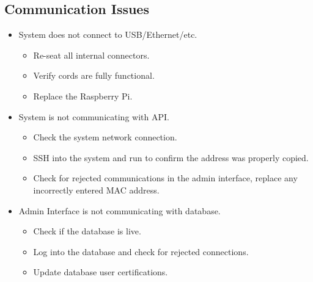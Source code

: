 \subsection{Communication Issues}
\begin{itemize}
    \item System does not connect to USB/Ethernet/etc.
    \begin{itemize}
        \item Re-seat all internal connectors.
        \item Verify cords are fully functional.
        \item Replace the Raspberry Pi.
    \end{itemize}
    \item System is not communicating with API.
    \begin{itemize}
        \item Check the system network connection.
        \item SSH into the system and run  to confirm the address was properly copied.
        \item Check for rejected communications in the admin interface, replace any incorrectly entered MAC address.
    \end{itemize}
    \item Admin Interface is not communicating with database.
    \begin{itemize}
        \item Check if the database is live.
        \item Log into the database and check for rejected connections.
        \item Update database user certifications.
    \end{itemize}
\end{itemize}

